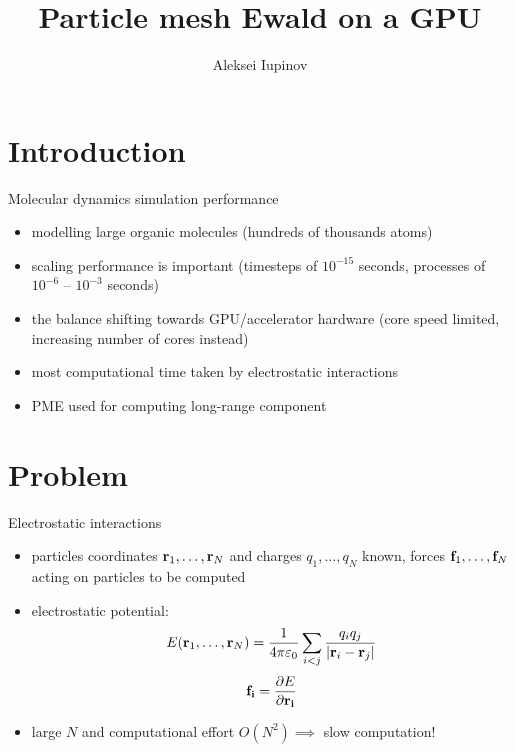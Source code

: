 \documentclass[11pt]{beamer}
\author{Aleksei Iupinov}
\title{Particle mesh Ewald on a GPU}
\institute{KTH Royal Institute of Technology}
\begin{document}
\begin{frame}
\titlepage
\end{frame}

\begin{frame}
\tableofcontents
\end{frame}

\section{Introduction}
\begin{frame}{Molecular dynamics simulation performance}
\begin{itemize}
\item modelling large organic molecules (hundreds of thousands atoms)
\item scaling performance is important (timesteps of $10^{-15}$ seconds, processes of $10^{-6}$ -- $10^{-3}$ seconds) 
\item the balance shifting towards GPU/accelerator hardware (core speed limited, increasing number of cores instead)
\item most computational time taken by electrostatic interactions
\item PME used for computing long-range component
\end{itemize}
\end{frame}

\section{Problem}
\begin{frame}{Electrostatic interactions}
\begin{itemize}
\item particles coordinates $\bold{r}_1, \dotsc, \bold{r}_N$ and charges $q_1, \dotsc, q_N$ known, forces $\bold{f}_1, \dotsc, \bold{f}_N$ acting on particles to be computed 
\item electrostatic potential:
\[E(\bold{r}_1, \dotsc, \bold{r}_N) = \frac{1}{4 \pi \varepsilon_0}\sum\limits_{i < j}\frac{q_i q_j}{\lvert \bold{r}_i-\bold{r}_j\rvert}\]
\[\bold{f_i} = \frac{\partial E}{\partial \bold{r_i}} \]
\item large $N$ and computational effort $O(N^2) \implies$ slow computation!
\end{itemize}
\end{frame}
\end{document}
